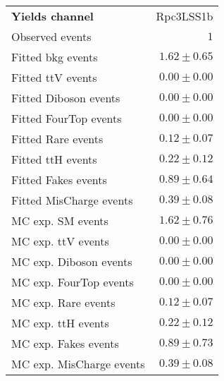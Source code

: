 

\begin{table}
\begin{center}
\setlength{\tabcolsep}{0.0pc}
{\small
\begin{tabular*}{\textwidth}{@{\extracolsep{\fill}}lr}
\noalign{\smallskip}\hline\noalign{\smallskip}
{\bfseries Yields channel}           & Rpc3LSS1b              \\[-0.05cm]
\noalign{\smallskip}\hline\noalign{\smallskip}
Observed events          & $1$                    \\
\noalign{\smallskip}\hline\noalign{\smallskip}
Fitted bkg events         & $1.62 \pm 0.65$              \\
\noalign{\smallskip}\hline\noalign{\smallskip}
        Fitted ttV events         & $0.00 \pm 0.00$              \\
        Fitted Diboson events         & $0.00 \pm 0.00$              \\
        Fitted FourTop events         & $0.00 \pm 0.00$              \\
        Fitted Rare events         & $0.12 \pm 0.07$              \\
        Fitted ttH events         & $0.22 \pm 0.12$              \\
        Fitted Fakes events         & $0.89 \pm 0.64$              \\
        Fitted MisCharge events         & $0.39 \pm 0.08$              \\
 \noalign{\smallskip}\hline\noalign{\smallskip}
MC exp. SM events              & $1.62 \pm 0.76$              \\
\noalign{\smallskip}\hline\noalign{\smallskip}
        MC exp. ttV events         & $0.00 \pm 0.00$              \\
        MC exp. Diboson events         & $0.00 \pm 0.00$              \\
        MC exp. FourTop events         & $0.00 \pm 0.00$              \\
        MC exp. Rare events         & $0.12 \pm 0.07$              \\
        MC exp. ttH events         & $0.22 \pm 0.12$              \\
        MC exp. Fakes events         & $0.89 \pm 0.73$              \\
        MC exp. MisCharge events         & $0.39 \pm 0.08$              \\

\end{tabular*}}
\end{center}
\end{table}
